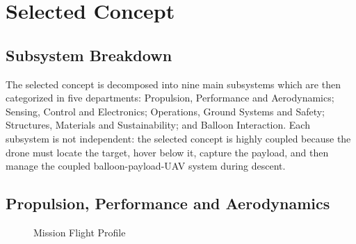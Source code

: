 \chapter{Selected Concept}




\section{Subsystem Breakdown}


The selected concept is decomposed into nine main subsystems which are then categorized in five departments: Propulsion, Performance and Aerodynamics; Sensing, Control and Electronics; Operations, Ground Systems and Safety; Structures, Materials and Sustainability; and Balloon Interaction. Each subsystem is not independent: the selected concept is highly coupled because the drone must locate the target, hover below it, capture the payload, and then manage the coupled balloon-payload-UAV system during descent.

\section{Propulsion, Performance and Aerodynamics}



\begin{figure}[h!]
    \centering
        \resizebox{0.6\textwidth}{!}{%
        
    }
    \caption{Mission Flight Profile}
    \label{fig:MFP}
\end{figure}

